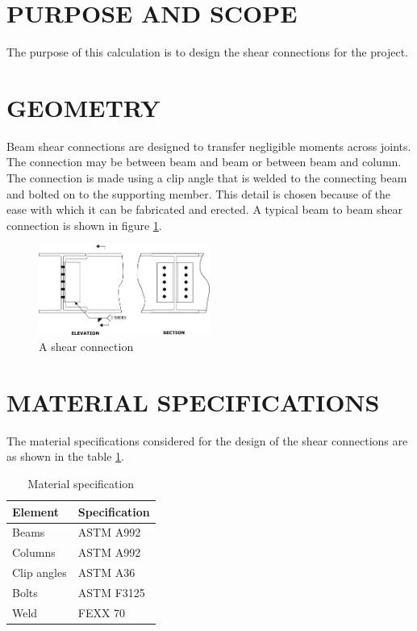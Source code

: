 \section{PURPOSE AND SCOPE}
The purpose of this calculation is to design the shear connections for 
the \calcproject  project.

\section{GEOMETRY}
Beam shear connections are designed to transfer negligible moments across
joints. The connection may be between beam and beam or between beam and column.
The connection is made using a clip angle that is welded to the connecting beam
and bolted on to the supporting member. This detail is chosen because of the
ease with which it can be fabricated and erected. A typical beam to beam shear
connection is shown in figure \ref{fig:shear_conn}. 

\begin{figure}[h]
    \centering
    \includegraphics[width=0.5\textwidth]{./images/sc001_1}
    \caption{A shear connection}
    \label{fig:shear_conn}
\end{figure}

\section{MATERIAL SPECIFICATIONS}
The material specifications considered for the design of the shear connections
are as shown in the table \ref{tab:mat_spec}.

\begin{table}[h]
    \centering
    \ttfamily
    \begin{tabular}{ll}
        Element         &Specification\\
        \hline
        Beams           &ASTM A992\\
        Columns         &ASTM A992\\
        Clip angles     &ASTM A36\\
        Bolts           &ASTM F3125\\
        Weld            &FEXX 70\\
        \hline
    \end{tabular}
    \caption{Material specification}
    \label{tab:mat_spec}
\end{table}

